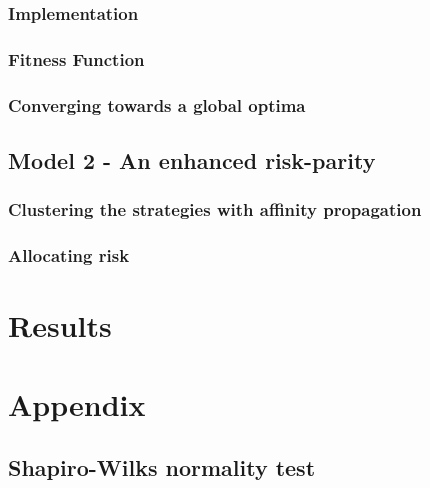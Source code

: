 \documentclass[12pt]{article} %
\numberwithin{equation}{subsection}
\begin{document}



\subsubsection{Implementation}



\subsubsection{Fitness Function}



\subsubsection{Converging towards a global optima}



\subsection{Model 2 - An enhanced risk-parity}



\subsubsection{Clustering the strategies with affinity propagation}

\subsubsection{Allocating risk}



\section*{Results}

\section*{Appendix}


\subsection*{Shapiro-Wilks normality test}
\end{document}
